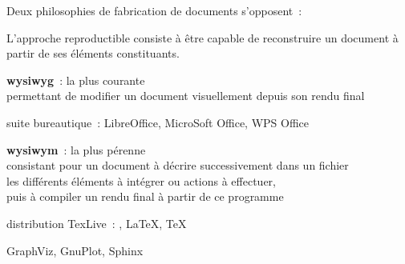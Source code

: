 Deux philosophies de fabrication de documents s’opposent :

L’approche reproductible consiste à être capable de reconstruire un document
à partir de ses éléments constituants.

\begin{itmz}
\item{\textbf{\gls{wysiwyg}} : la plus courante\\
permettant de modifier un document visuellement depuis son rendu final
    \begin{itmz}
    \item{suite bureautique : LibreOffice, MicroSoft Office, WPS Office}
    \end{itmz}
}
\item{\textbf{\gls{wysiwym}} : la plus pérenne\\
consistant pour un document à décrire successivement dans un fichier\\
les différents éléments à intégrer ou actions à effectuer,\\
puis à compiler un rendu final à partir de ce programme
    \begin{itmz}
    \item{distribution TexLive : \XeLaTeX, \LaTeX, \TeX \cite{latex}}
    \item{GraphViz, GnuPlot, Sphinx \cite{sphinx}}
    \end{itmz}
}
\end{itmz}

\pagebreak
